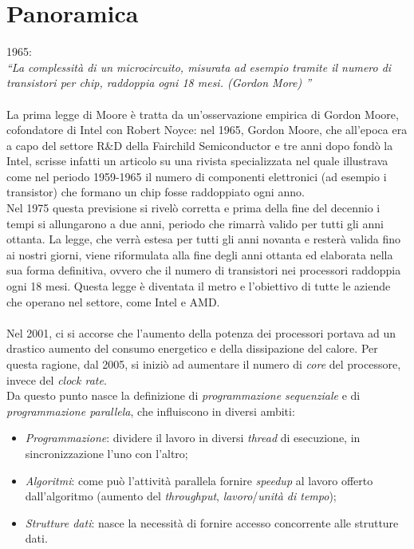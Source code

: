 \section{Panoramica}
1965: \\
\textit{\textquotedblleft La complessità di un microcircuito, misurata ad esempio tramite il numero di transistori per chip, raddoppia ogni 18 mesi. (\textit{Gordon More}) \textquotedblright}\\\\

La prima legge di Moore è tratta da un'osservazione empirica di Gordon Moore, cofondatore di Intel con Robert Noyce: nel 1965, Gordon Moore, che all'epoca era a capo del settore R\&D della Fairchild Semiconductor e tre anni dopo fondò la Intel, scrisse infatti un articolo su una rivista specializzata nel quale illustrava come nel periodo 1959-1965 il numero di componenti elettronici (ad esempio i transistor) che formano un chip fosse raddoppiato ogni anno. \\
Nel 1975 questa previsione si rivelò corretta e prima della fine del decennio i tempi si allungarono a due anni, periodo che rimarrà valido per tutti gli anni ottanta. La legge, che verrà estesa per tutti gli anni novanta e resterà valida fino ai nostri giorni, viene riformulata alla fine degli anni ottanta ed elaborata nella sua forma definitiva, ovvero che il numero di transistori nei processori raddoppia ogni 18 mesi. Questa legge è diventata il metro e l'obiettivo di tutte le aziende che operano nel settore, come Intel e AMD. \\\\

Nel 2001, ci si accorse che l'aumento della potenza dei processori portava ad un drastico aumento del consumo energetico e della dissipazione del calore.
Per questa ragione, dal 2005, si iniziò ad aumentare il numero di \textit{core} del processore, invece del \textit{clock rate}. \\
Da questo punto nasce la definizione di \textit{programmazione sequenziale} e di \textit{programmazione parallela}, che influiscono in diversi ambiti:
\begin{itemize}
	\item \textit{Programmazione}: dividere il lavoro in diversi \textit{thread} di esecuzione, in sincronizzazione l'uno con l'altro;
	\item \textit{Algoritmi}: come può l'attività parallela fornire \textit{speedup} al lavoro offerto dall'algoritmo (aumento del \textit{throughput}, \textit{lavoro}/\textit{unità di tempo});
	\item \textit{Strutture dati}: nasce la necessità di fornire accesso concorrente alle strutture dati.
\end{itemize}

